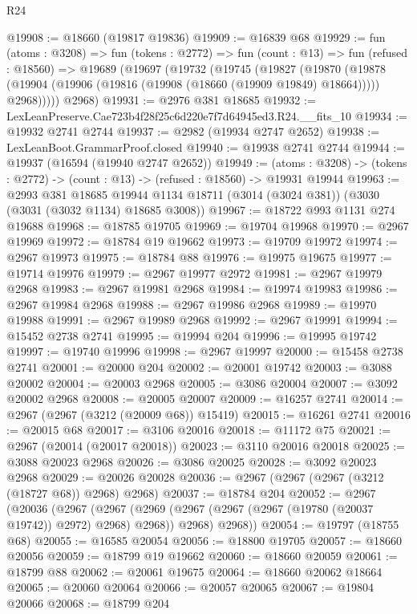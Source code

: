 \begin{lexlean}{R24}
\begin{coremodule}
@19908 := @18660 (@19817 @19836)
@19909 := @16839 @68
@19929 := fun (atoms : @3208) =>
  fun (tokens : @2772) =>
  fun (count : @13) =>
  fun (refused : @18560) =>
  @19689
    (@19697
      (@19732
        (@19745
          (@19827
            (@19870
              (@19878 (@19904 (@19906 (@19816 (@19908 (@18660 (@19909 @19849) @18664))))) @2968)))))
      @2968)
@19931 := @2976 @381 @18685
@19932 := LexLeanPreserve.Cae723b4f28f25c6d220e7f7d64945ed3.R24.__fits_10
@19934 := @19932 @2741 @2744
@19937 := @2982 (@19934 @2747 @2652)
@19938 := LexLeanBoot.GrammarProof.closed
@19940 := @19938 @2741 @2744
@19944 := @19937 (@16594 (@19940 @2747 @2652))
@19949 := (atoms : @3208) ->
  (tokens : @2772) -> (count : @13) -> (refused : @18560) -> @19931 @19944
@19963 := @2993
    @381
    @18685
    @19944
    @1134
    @18711
    (@3014 (@3024 @381))
    (@3030 (@3031 (@3032 @1134) @18685 @3008))
@19967 := @18722 @993 @1131 @274 @19688
@19968 := @18785 @19705
@19969 := @19704 @19968
@19970 := @2967 @19969
@19972 := @18784 @19 @19662
@19973 := @19709 @19972
@19974 := @2967 @19973
@19975 := @18784 @88
@19976 := @19975 @19675
@19977 := @19714 @19976
@19979 := @2967 @19977 @2972
@19981 := @2967 @19979 @2968
@19983 := @2967 @19981 @2968
@19984 := @19974 @19983
@19986 := @2967 @19984 @2968
@19988 := @2967 @19986 @2968
@19989 := @19970 @19988
@19991 := @2967 @19989 @2968
@19992 := @2967 @19991
@19994 := @15452 @2738 @2741
@19995 := @19994 @204
@19996 := @19995 @19742
@19997 := @19740 @19996
@19998 := @2967 @19997
@20000 := @15458 @2738 @2741
@20001 := @20000 @204
@20002 := @20001 @19742
@20003 := @3088 @20002
@20004 := @20003 @2968
@20005 := @3086 @20004
@20007 := @3092 @20002 @2968
@20008 := @20005 @20007
@20009 := @16257 @2741
@20014 := @2967 (@2967 (@3212 (@20009 @68)) @15419)
@20015 := @16261 @2741
@20016 := @20015 @68
@20017 := @3106 @20016
@20018 := @11172 @75
@20021 := @2967 (@20014 (@20017 @20018))
@20023 := @3110 @20016 @20018
@20025 := @3088 @20023 @2968
@20026 := @3086 @20025
@20028 := @3092 @20023 @2968
@20029 := @20026 @20028
@20036 := @2967 (@2967 (@2967 (@3212 (@18727 @68)) @2968) @2968)
@20037 := @18784 @204
@20052 := @2967
    (@20036
      (@2967
        (@2967 (@2969 (@2967 (@2967 (@2967 (@19780 (@20037 @19742)) @2972) @2968) @2968)) @2968)
        @2968))
@20054 := @19797 (@18755 @68)
@20055 := @16585 @20054
@20056 := @18800 @19705
@20057 := @18660 @20056
@20059 := @18799 @19 @19662
@20060 := @18660 @20059
@20061 := @18799 @88
@20062 := @20061 @19675
@20064 := @18660 @20062 @18664
@20065 := @20060 @20064
@20066 := @20057 @20065
@20067 := @19804 @20066
@20068 := @18799 @204

\end{coremodule}
\end{lexlean}
